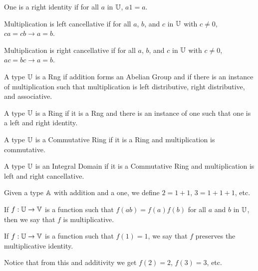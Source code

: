 \documentclass[../math.tex]{subfiles}
\begin{document}
\begin{class}
    One is a right identity if for all $a$ in $\mathbb{U}$, $a1 = a$.
\end{class}

\begin{class}
    Multiplication is left cancellative if for all $a$, $b$, and $c$ in $\mathbb{U}$
    with $c \neq 0$, $ca = cb \rightarrow a = b$.
\end{class}

\begin{class}
    Multiplication is right cancellative if for all $a$, $b$, and $c$ in $\mathbb{U}$
    with $c \neq 0$, $ac = bc \rightarrow a = b$.
\end{class}

\begin{class}[Rng]
    A type $\mathbb{U}$ is a Rng if addition forms an Abelian Group and if there is an
    instance of multiplication such that multiplication is left distributive,
    right distributive, and associative.
\end{class}

\begin{class}[Ring]
    A type $\mathbb{U}$ is a Ring if it is a Rng and there is an instance of one such
    that one is a left and right identity.
\end{class}

\begin{class}
    A type $\mathbb{U}$ is a Commutative Ring if it is a Ring and multiplication is
    commutative.
\end{class}

\begin{class}
    A type $\mathbb{U}$ is an Integral Domain if it is a Commutative Ring and
    multiplication is left and right cancellative.
\end{class}

\begin{definition}
    Given a type $\mathbb{A}$ with addition and a one, we define $2 = 1 + 1$, $3 = 1 +
    1 + 1$, etc.
\end{definition}

\begin{class}
    If $f : \mathbb{U} \to \mathbb{V}$ is a function such that $f(ab) = f(a)f(b)$ for all $a$
    and $b$ in $\mathbb{U}$, then we say that $f$ is multiplicative.
\end{class}

\begin{class}
    If $f : \mathbb{U} \to \mathbb{V}$ is a function such that $f(1) = 1$, we say that $f$
    preserves the multiplicative identity.
\end{class}
Notice that from this and additivity we get $f(2) = 2$, $f(3) = 3$, etc.
\end{document}
